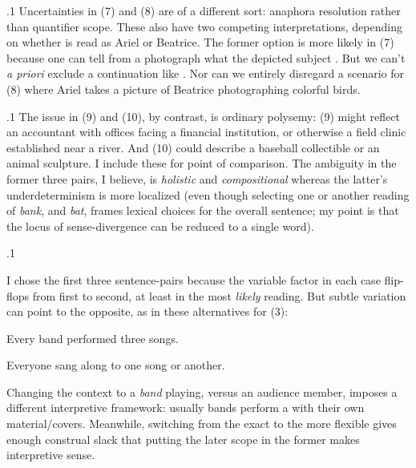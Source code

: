 \documentclass[11pt, twocolumn]{article}
\begin{document}
\p.1{%
\:\+Uncertainties in \exsRef(7) and \exsRef(8) are of a different sort: anaphora resolution rather than quantifier scope. \> These 
also have two competing interpretations, depending on whether  is read as Ariel or Beatrice. \> The
former option is more likely in \exsRef(7) because one can tell from a photograph what the depicted subject
. \> But we can't \textit{a priori} exclude a continuation like . \> Nor 
can we entirely disregard a scenario for \exsRef(8) where Ariel takes a picture of
Beatrice photographing colorful birds.\<\;
} %

\p.1{%
\:\+The issue in \exsRef(9) and \exsRef(10), by contrast, is ordinary polysemy: \exsRef(9) might reflect an
accountant with offices facing a financial institution, or otherwise a field clinic established \pgl{}near
a river. \> And \exsRef(10) could describe a baseball collectible or an animal sculpture. \> I include these for 
point of comparison. \> The ambiguity in the former three pairs,
I believe, is \textit{holistic} and \textit{compositional} whereas the latter's underdeterminism
is more localized (even though selecting one or another reading of \textit{bank}, and
\textit{bat}, frames lexical choices for the overall sentence; my point is that
the locus of sense-divergence can be reduced to a single word).\<\;
} %

\p.1{%
\:\+I chose the first three sentence-pairs because the variable factor in each
case flip-flops from first to second, at least
in the most \textit{likely} reading. \> But subtle variation can point to the opposite, as in these alternatives
for \exsRef(3):\<

\begin{exsGroup}

\exsItem{}   Every band performed three songs.

\exsItem{}   Everyone sang along to one song or another.

\end{exsGroup}

\nip{}%
\+Changing the context to a \textit{band} playing, versus an audience member, imposes a different interpretive
framework: usually bands perform a  with their own 
material/\allowbreak{}covers. \> Meanwhile, switching
from the exact  to the more flexible  gives enough construal slack that
putting the later scope in the former makes interpretive sense.\<\;
\ifnum{}\else{\thispagestyle{two}}\fi
} %
\end{document}
